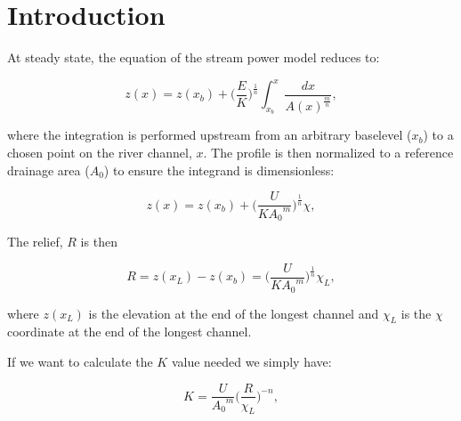 \documentclass[12pt]{article}
\begin{document}
\maketitle



\section{Introduction}
At steady state, the equation of the stream power model reduces to:

\begin{equation} \label{eq:profile_eqn_integrate}
z(x) = z(x_b) + \Bigg(\frac{E}{K}\Bigg)^{\frac{1}{n}} \int_{x_b}^{x} \frac{dx}{A(x)^{\frac{m}{n}}},
\end{equation}

where the integration is performed upstream from an arbitrary baselevel ($x_b$) to a chosen point on the river channel, $x$.  The profile is then normalized to a reference drainage area ($A_0$) to ensure the integrand is dimensionless:

\begin{equation} \label{eq:chi_profile}
z(x) = z(x_b) + \Bigg(\frac{U}{K{A_0}^m}\Bigg)^{\frac{1}{n}} \chi,
\end{equation}

The relief, $R$ is then


\begin{equation} \label{eq:relief_profile}
R = z(x_L) - z(x_b) = \Bigg(\frac{U}{K{A_0}^m}\Bigg)^{\frac{1}{n}} \chi_L,
\end{equation}

where $z(x_L)$ is the elevation at the end of the longest channel and $\chi_L$ is the $\chi$ coordinate at the end of the longest channel. 

If we want to calculate the $K$ value needed we simply have:

\begin{equation} \label{eq:K_relief}
K = \frac{U}{{A_0}^m} \Bigg( \frac{R}{\chi_L} \Bigg)^{-n},
\end{equation}
\end{document}
